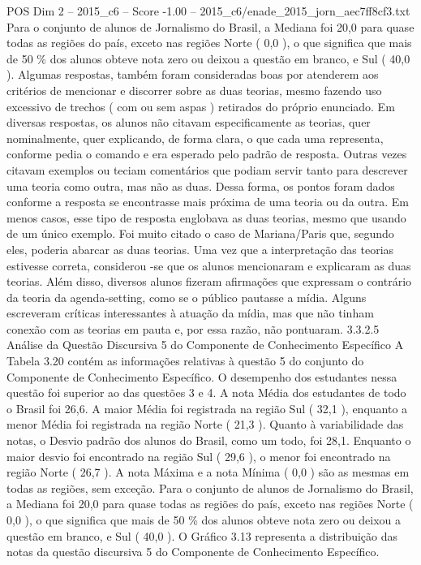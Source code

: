 \begin{textsample}{POS Dim 2 – 2015\_c6 – Score -1.00 – 2015\_c6/enade\_2015\_jorn\_aec7ff8cf3.txt}
Para o conjunto de alunos de Jornalismo do Brasil, a Mediana foi 20,0 para quase todas as regiões do país, exceto nas regiões Norte ( 0,0 ), o que significa que mais de 50 \% dos alunos obteve nota zero ou deixou a questão em branco, e Sul ( 40,0 ).
Algumas respostas, também foram consideradas boas por atenderem aos critérios de mencionar e discorrer sobre as duas teorias, mesmo fazendo uso excessivo de trechos ( com ou sem aspas ) retirados do próprio enunciado.
Em diversas respostas, os alunos não citavam especificamente as teorias, quer nominalmente, quer explicando, de forma clara, o que cada uma representa, conforme pedia o comando e era esperado pelo padrão de resposta.
Outras vezes citavam exemplos ou teciam comentários que podiam servir tanto para descrever uma teoria como outra, mas não as duas.
Dessa forma, os pontos foram dados conforme a resposta se encontrasse mais próxima de uma teoria ou da outra.
Em menos casos, esse tipo de resposta englobava as duas teorias, mesmo que usando de um único exemplo.
Foi muito citado o caso de Mariana/Paris que, segundo eles, poderia abarcar as duas teorias.
Uma vez que a interpretação das teorias estivesse correta, considerou -se que os alunos mencionaram e explicaram as duas teorias.
Além disso, diversos alunos fizeram afirmações que expressam o contrário da teoria da agenda-setting, como se o público pautasse a mídia.
Alguns escreveram críticas interessantes à atuação da mídia, mas que não tinham conexão com as teorias em pauta e, por essa razão, não pontuaram. 3.3.2.5 Análise da Questão Discursiva 5 do Componente de Conhecimento Específico A Tabela 3.20 contém as informações relativas à questão 5 do conjunto do Componente de Conhecimento Específico.
O desempenho dos estudantes nessa questão foi superior ao das questões 3 e 4.
A nota Média dos estudantes de todo o Brasil foi 26,6.
A maior Média foi registrada na região Sul ( 32,1 ), enquanto a menor Média foi registrada na região Norte ( 21,3 ).
Quanto à variabilidade das notas, o Desvio padrão dos alunos do Brasil, como um todo, foi 28,1.
Enquanto o maior desvio foi encontrado na região Sul ( 29,6 ), o menor foi encontrado na região Norte ( 26,7 ).
A nota Máxima e a nota Mínima ( 0,0 ) são as mesmas em todas as regiões, sem exceção.
Para o conjunto de alunos de Jornalismo do Brasil, a Mediana foi 20,0 para quase todas as regiões do país, exceto nas regiões Norte ( 0,0 ), o que significa que mais de 50 \% dos alunos obteve nota zero ou deixou a questão em branco, e Sul ( 40,0 ).
O Gráfico 3.13 representa a distribuição das notas da questão discursiva 5 do Componente de Conhecimento Específico.

\end{textsample}
